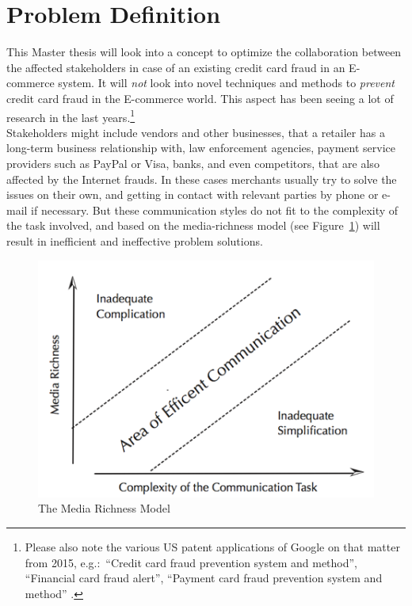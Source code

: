 
\section{Problem Definition}
\label{sec:problem_definition}

This Master thesis will look into a concept to optimize the collaboration between the affected stakeholders in case of an existing credit card fraud in an \gls{E-commerce} system. It will \emph{not} look into novel techniques and methods to \emph{prevent} credit card fraud in the \gls{E-commerce} world. This aspect has been seeing a lot of research in the last years.\footnote{Please also note the various US patent applications of Google on that matter from 2015, e.g.:\ “Credit card fraud prevention system and method”, “Financial card fraud alert”, “Payment card fraud prevention system and method” \citep{GooglePatents2015}.} \\

Stakeholders might include vendors and other businesses, that a retailer has a long-term business relationship with, law enforcement agencies, payment service providers such as PayPal or Visa, banks, and even competitors, that are also affected by the Internet frauds. In these cases merchants usually try to solve the issues on their own, and getting in contact with relevant parties by phone or e-mail if necessary. But these communication styles do not fit to the complexity of the task involved, and based on the media-richness model (see Figure~\ref{fig:images_media_richness_model}) will result in inefficient and ineffective problem solutions. \\

\begin{figure}[!ht]
	\centering
		\includegraphics[width=0.7\columnwidth]{images/media-richness-model.png}
	\caption[The Media Richness Model]{The Media Richness Model \citep{Rice1992}}
\label{fig:images_media_richness_model}
\end{figure}

